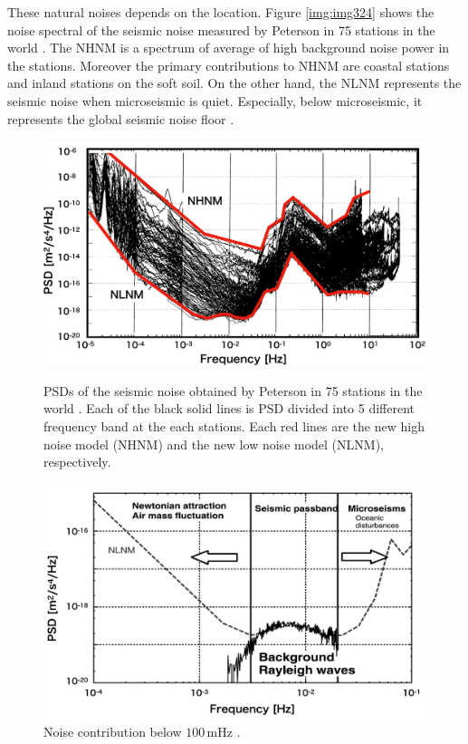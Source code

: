 These natural noises depends on the location. Figure \ref{img:img324} shows the noise spectral of the seismic noise measured by Peterson in 75 stations in the world \cite{peterson1993observations}. The NHNM is a spectrum of average of high background noise power in the stations. Moreover the primary contributions to NHNM are coastal stations and inland stations on the soft soil. On the other hand, the NLNM represents the seismic noise when microseismic is quiet. Especially, below microseismic, it represents the global seismic noise floor \cite{nishida2002origin}. 

\begin{figure}[p]
  \begin{center}   
    \includegraphics[width=12.5cm]{./img_chap3/img324.png}
    \caption{PSDs of the seismic noise obtained by Peterson in 75 stations in the world \cite{peterson1993observations}. Each of the black solid lines is PSD divided into 5 different frequency band at the each stations. Each red lines are the new high noise model (NHNM) and the new low noise model (NLNM), respectively.}\label{img:img324}
  \end{center}
  \begin{center}   
    \includegraphics[width=13cm]{./img_chap3/img325.png}
    \caption{Noise contribution below $100\,\mathrm{mHz}$ \cite{nishida2002origin}. }\label{img:img325}
  \end{center} 
\end{figure}


